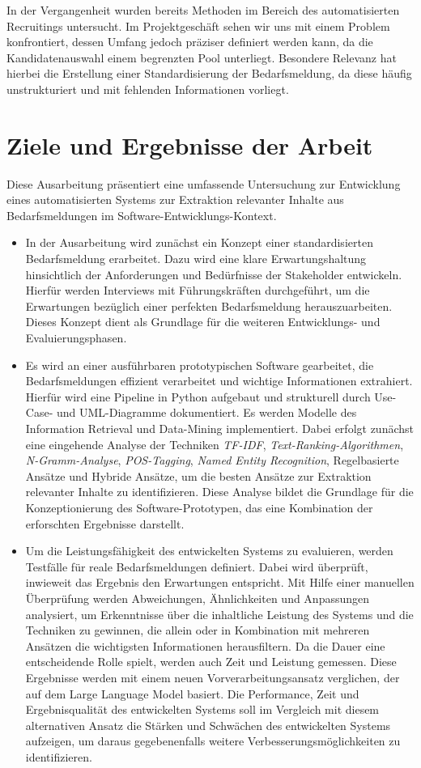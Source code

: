 \documentclass[a4paper,12pt]{scrreprt}
\newcommand{\hiddenchapter}[1]{
	\chapter*{{#1}}
}
\begin{document}
In der Vergangenheit wurden bereits Methoden im Bereich des automatisierten Recruitings untersucht. Im Projektgeschäft sehen wir uns mit einem Problem konfrontiert, dessen Umfang jedoch präziser definiert werden kann, da die Kandidatenauswahl einem begrenzten Pool unterliegt. Besondere Relevanz hat hierbei die Erstellung einer Standardisierung der Bedarfsmeldung, da diese häufig unstrukturiert und mit fehlenden Informationen vorliegt.
\hiddenchapter{Ziele und Ergebnisse der Arbeit}
Diese Ausarbeitung präsentiert eine umfassende Untersuchung zur Entwicklung eines automatisierten Systems zur Extraktion relevanter Inhalte aus Bedarfsmeldungen im Software-Entwicklungs-Kontext.
\begin{itemize}
	\item In der Ausarbeitung wird zunächst ein Konzept einer standardisierten Bedarfsmeldung erarbeitet. Dazu wird eine klare Erwartungshaltung hinsichtlich der Anforderungen und Bedürfnisse der Stakeholder entwickeln. Hierfür werden Interviews mit Führungskräften durchgeführt, um die Erwartungen bezüglich einer \glqq{}perfekten\grqq{} Bedarfsmeldung herauszuarbeiten. Dieses Konzept dient als Grundlage für die weiteren Entwicklungs- und Evaluierungsphasen.
	\item Es wird an einer ausführbaren prototypischen Software gearbeitet, die Bedarfsmeldungen effizient verarbeitet und wichtige Informationen extrahiert. Hierfür wird eine Pipeline in Python aufgebaut und strukturell durch Use-Case- und UML-Diagramme dokumentiert. Es werden Modelle des Information Retrieval und Data-Mining implementiert. Dabei erfolgt zunächst eine eingehende Analyse der Techniken \emph{TF-IDF}, \emph{Text-Ranking-Algorithmen}, \emph{N-Gramm-Analyse}, \emph{POS-Tagging}, \emph{Named Entity Recognition}, Regelbasierte Ansätze und Hybride Ansätze, um die besten Ansätze zur Extraktion relevanter Inhalte zu identifizieren. Diese Analyse bildet die Grundlage für die Konzeptionierung des Software-Prototypen, das eine Kombination der erforschten Ergebnisse darstellt.
	\item Um die Leistungsfähigkeit des entwickelten Systems zu evaluieren, werden Testfälle für reale Bedarfsmeldungen definiert. Dabei wird überprüft, inwieweit das Ergebnis den Erwartungen entspricht. Mit Hilfe einer manuellen Überprüfung werden Abweichungen, Ähnlichkeiten und Anpassungen analysiert, um Erkenntnisse über die inhaltliche Leistung des Systems und die Techniken zu gewinnen, die allein oder in Kombination mit mehreren Ansätzen die wichtigsten Informationen herausfiltern. Da die Dauer eine entscheidende Rolle spielt, werden auch Zeit und Leistung gemessen. Diese Ergebnisse werden mit einem neuen Vorverarbeitungsansatz verglichen, der auf dem Large Language Model basiert. Die Performance, Zeit und Ergebnisqualität des entwickelten Systems soll im Vergleich mit diesem alternativen Ansatz die Stärken und Schwächen des entwickelten Systems aufzeigen, um daraus gegebenenfalls weitere Verbesserungsmöglichkeiten zu identifizieren.
\end{itemize}
\end{document}
